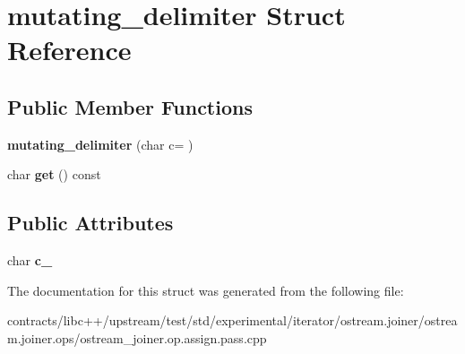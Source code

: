 \hypertarget{structmutating__delimiter}{}\section{mutating\+\_\+delimiter Struct Reference}
\label{structmutating__delimiter}
\subsection*{Public Member Functions}
\begin{DoxyCompactItemize}
\item 
\mbox{\label{structmutating__delimiter_a8b6b532173457fc21df3e7de0b107a13}} 
{\bfseries mutating\+\_\+delimiter} (char c=\textquotesingle{} \textquotesingle{})
\item 
\mbox{\label{structmutating__delimiter_a85e0097150df5d5893ae2a36e337f608}} 
char {\bfseries get} () const
\end{DoxyCompactItemize}
\subsection*{Public Attributes}
\begin{DoxyCompactItemize}
\item 
\mbox{\label{structmutating__delimiter_a071dfa67b9f28c3a904193bcc84606e4}} 
char {\bfseries c\+\_\+}
\end{DoxyCompactItemize}


The documentation for this struct was generated from the following file\+:\begin{DoxyCompactItemize}
\item 
contracts/libc++/upstream/test/std/experimental/iterator/ostream.\+joiner/ostream.\+joiner.\+ops/ostream\+\_\+joiner.\+op.\+assign.\+pass.\+cpp\end{DoxyCompactItemize}
